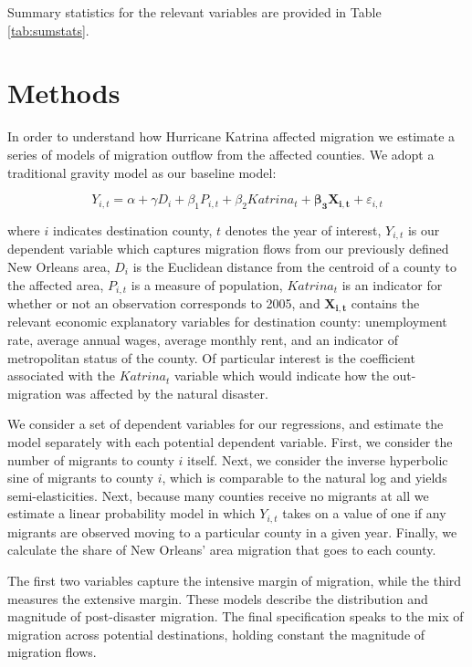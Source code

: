 \documentclass[]{article}
\begin{document}
Summary statistics for the relevant variables are provided in Table
\ref{tab:sumstats}.

\section{\texorpdfstring{Methods
\label{sec:methods}}{Methods }}\label{methods}

In order to understand how Hurricane Katrina affected migration we
estimate a series of models of migration outflow from the affected
counties. We adopt a traditional gravity model as our baseline model:

\[ Y_{i,t} = \alpha + \gamma {D}_{i} + \beta_1 {P}_{i,t} + \beta_2 {Katrina}_{t} + \mathbf{\beta_3} \mathbf{X_{i,t}} + \varepsilon_{i,t} \label{eq:basereg} \]

where \(i\) indicates destination county, \(t\) denotes the year of
interest, \(Y_{i,t}\) is our dependent variable which captures migration
flows from our previously defined New Orleans area, \({D}_{i}\) is the
Euclidean distance from the centroid of a county to the affected area,
\({P}_{i,t}\) is a measure of population, \({Katrina}_{t}\) is an
indicator for whether or not an observation corresponds to 2005, and
\(\mathbf{X_{i,t}}\) contains the relevant economic explanatory
variables for destination county: unemployment rate, average annual
wages, average monthly rent, and an indicator of metropolitan status of
the county. Of particular interest is the coefficient associated with
the \({Katrina}_{t}\) variable which would indicate how the
out-migration was affected by the natural disaster.

We consider a set of dependent variables for our regressions, and
estimate the model separately with each potential dependent variable.
First, we consider the number of migrants to county \(i\) itself. Next,
we consider the inverse hyperbolic sine of migrants to county \(i\),
which is comparable to the natural log and yields semi-elasticities.
Next, because many counties receive no migrants at all we estimate a
linear probability model in which \(Y_{i,t}\) takes on a value of one if
any migrants are observed moving to a particular county in a given year.
Finally, we calculate the share of New Orleans' area migration that goes
to each county.

The first two variables capture the intensive margin of migration, while
the third measures the extensive margin. These models describe the
distribution and magnitude of post-disaster migration. The final
specification speaks to the mix of migration across potential
destinations, holding constant the magnitude of migration flows.
\end{document}
